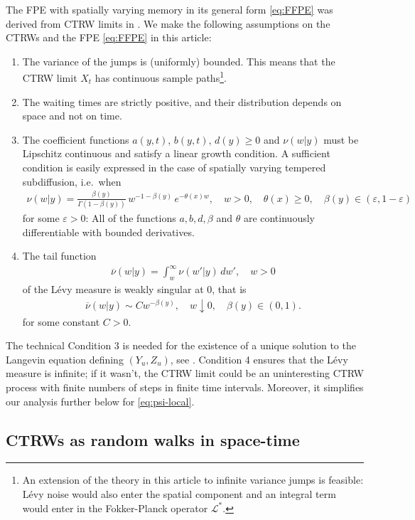 \documentclass[a4paper,12pt]{elsarticle}
\numberwithin{equation}{section}
\theoremstyle{plain}
\theoremstyle{definition}
\theoremstyle{remark}
\numberwithin{equation}{section}
\newcommand{\1}{\mathbf 1}
\begin{document}
The FPE with spatially varying memory in its general form \eqref{eq:FFPE} was derived from CTRW limits in \cite{BaeumerStraka16}.  We make the following assumptions on the CTRWs and the FPE \eqref{eq:FFPE} in this article:
\begin{enumerate}
\item
The variance of the jumps is (uniformly) bounded.  This means that the CTRW limit $X_t$ has continuous sample paths\footnote{An extension of the theory in this article to infinite variance jumps is feasible: L\'evy noise would also enter the spatial component and an integral term would enter in the Fokker-Planck operator $\mathcal L^*$.}.
\item
The waiting times are strictly positive, and their distribution depends on space and not on time.
\item
The coefficient functions $a(y,t)$, $b(y,t)$, $d(y) \ge 0$ and $\nu(w|y)$ must be Lipschitz continuous and satisfy a linear growth condition.
A sufficient condition is easily expressed in the case of spatially varying tempered subdiffusion, i.e.\ when
\begin{align}
\nu(w|y) = \frac{\beta(y)}{\Gamma(1-\beta(y))}\, w^{-1-\beta(y)}\,
e^{-\theta(x) w}, \quad w > 0, \quad \theta(x) \ge 0, \quad \beta(y) \in (\varepsilon,1-\varepsilon)
\end{align}
for some $\varepsilon > 0$: All of the functions $a, b, d, \beta$ and $\theta$ are continuously differentiable with bounded derivatives.
\item
The tail function
\begin{align}
\overline \nu(w | y) = \int_w^\infty \nu(w'|y)\,dw', \quad w > 0
\end{align}
of the L\'evy measure is weakly singular at $0$, that is
\begin{align} \label{eq:ass4}
\overline \nu(w|y) \sim C w^{-\beta(y)}, \quad w \downarrow 0,
\quad \beta(y) \in (0,1).
\end{align}
for some constant $C > 0$.
\end{enumerate}
The technical Condition 3 is needed for the existence of a unique solution to the Langevin equation defining $(Y_u, Z_u)$, see \cite{Straka17}.
Condition 4 ensures that the L\'evy measure is infinite; if it wasn't, the CTRW limit could be an uninteresting CTRW process with finite numbers of steps in finite time intervals.  Moreover, it simplifies our analysis further below for \eqref{eq:psi-local}.


\subsection{CTRWs as random walks in space-time}
\end{document}
